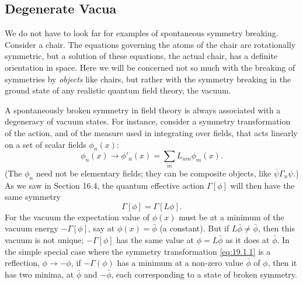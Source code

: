 \subsection{Degenerate Vacua}
\label{sec:19.1}

We do not have to look far for examples of spontaneous symmetry breaking.
Consider a chair. The equations governing the atoms of the chair are
rotationally symmetric, but a solution of these equations, the actual chair,
has a definite orientation in space. Here we will be concerned not so much
with the breaking of symmetries by \emph{objects} like chairs, but rather with
the symmetry breaking in the ground state of any realistic quantum field
theory, the vacuum.

A spontaneously broken symmetry in field theory is always associated with a
degeneracy of vacuum states. For instance, consider a symmetry transformation
of the action, and of the measure used in integrating over fields, that acts
linearly on a set of scalar fields $\phi_n(x)$:
\begin{equation}
 \phi_n(x)\longrightarrow\phi'_n(x)
 =\sum_m L_{nm}\phi_m(x).
 \tag{19.1.1}\label{eq:19.1.1}
\end{equation}
(The $\phi_n$ need not be elementary fields; they can be composite objects,
like $\bar\psi\Gamma_n\psi$.) As we saw in Section 16.4, the quantum effective
action $\Gamma[\phi]$ will then have the same symmetry
\begin{equation}
 \Gamma[\phi]=\Gamma[L\phi].
 \tag{19.1.2}\label{eq:19.1.2}
\end{equation}
For the vacuum the expectation value of $\phi(x)$ must be at a minimum of the
vacuum energy $-\Gamma[\phi]$, say at $\phi(x)=\bar\phi$ (a constant). But if
$L\bar\phi\ne\bar\phi$, then this vacuum is not unique; $-\Gamma[\phi]$ has
the same value at $\phi=L\bar\phi$ as it does at $\bar\phi$. In the simple
special case where the symmetry transformation \eqref{eq:19.1.1} is a
reflection, $\phi\to-\phi$, if $-\Gamma(\phi)$ has a minimum at a non-zero
value $\bar\phi$ of $\phi$, then it has two minima, at $\bar\phi$ and
$-\bar\phi$, each corresponding to a state of broken symmetry.

